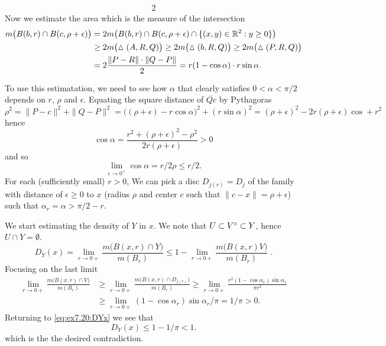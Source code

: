 \begin{enumerate}
\begin{itemize}
\begin{alignat*}{2}
\end{alignat*} 
Now we estimate the area which is the measure of the intersection
\begin{align*}
m\bigl(B(b,r) \cap B(c,\rho + \epsilon)\bigr)
&= 2m\bigl(B(b,r) \cap B(c,\rho + \epsilon) 
           \cap \{(x,y)\in\mathbb{R}^2: y\geq 0\} \bigr) \\
&\geq 2 m\bigl(\vartriangle(A,R,Q)\bigr) 
 \geq 2 m\bigl(\vartriangle(b,R,Q)\bigr) 
 \geq 2 m\bigl(\vartriangle(P,R,Q)\bigr) \\
&= 2 \frac{\|P-R\|\cdot \|Q-P\|}{2}
 = r(1-\cos\alpha)\cdot r\sin\alpha.
\end{align*}

To use this estimatation, we need to see how \(\alpha\)
that clearly satisfies \(0<\alpha < \pi/2\)
depends on $r$, \(\rho\) and \(\epsilon\).
Equating the square distance of \(\overline{Qc}\) by Pythagoras
\begin{equation*}
\rho^2 = \|P-c\|^2 + \|Q-P\|^2 
= \bigl((\rho+\epsilon)-r\cos\alpha\bigr)^2 +(r\sin\alpha)^2
= (\rho+\epsilon)^2-2r(\rho+\epsilon)\cos + r^2
\end{equation*}
hence
\begin{equation*}
\cos\alpha = \frac{r^2 + (\rho+\epsilon)^2 - \rho^2}{2r(\rho+\epsilon)} > 0
\end{equation*}
and so
\begin{equation*}
\lim_{\epsilon\to 0^+} \cos\alpha = r/2\rho \leq r/2.
\end{equation*}
For each (sufficiently small) \(r>0\), We can pick 
a disc \(D_{j(r)} = D_j\) of the family with distance of 
\(\epsilon\geq 0\) to $x$ 
(radius \(\rho\) and center $c$ such that \(\|c-x\| = \rho+\epsilon\))
such that \(\alpha_r = \alpha > \pi/2 - r\).

We start estimating the density of $Y$ in $x$. 
We note that \(U \subset V^{\circ} \subset Y\),
hence \(U \cap Y = \emptyset\).
\begin{equation} \label{eq:ex7.20:DYx}
D_Y(x) = 
\lim_{r\to0+} \frac{m\bigl( B(x,r) \cap Y\bigr)}{m(B_r)}
\leq
1 - \lim_{r\to0+} \frac{m\bigl( B(x,r) V\bigr)}{m(B_r)}\;.
\end{equation}
Focusing on the last limit 
\begin{align*}
\lim_{r\to 0+} \frac{m\bigl( B(x,r) \cap V\bigr)}{m(B_r)}
&\geq \lim_{r\to 0+} \frac{m\bigl( B(x,r) \cap D_{j(r)}\bigr)}{m(B_r)} 
 \geq \lim_{r\to 0+} \frac{r^2(1-\cos\alpha_r)\sin\alpha_r}{\pi r^2} \\
&\geq \lim_{r\to 0+} (1-\cos\alpha_r)\sin\alpha_r / \pi = 1/\pi > 0.
\end{align*}
Returning to \eqref{eq:ex7.20:DYx} we see that 
\begin{equation*}
D_Y(x) \leq 1 - 1/\pi < 1.
\end{equation*}
which is the the desired contradiction.



\end{itemize}
\end{enumerate}
